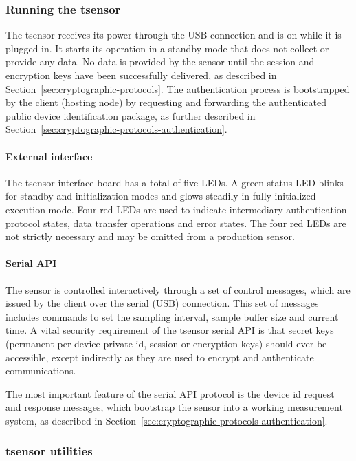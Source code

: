 \subsubsection{Running the tsensor}

The tsensor receives its power through the USB-connection and is on while it is plugged in. It starts its operation in a standby mode that does not collect or provide any data. No data is provided by the sensor until the session and encryption keys have been successfully delivered, as described in Section~\ref{sec:cryptographic-protocols}. The authentication process is bootstrapped by the client (hosting node) by requesting and forwarding the authenticated public device identification package, as further described in Section~\ref{sec:cryptographic-protocols-authentication}.

\paragraph{External interface}

The tsensor interface board has a total of five LEDs. A green status LED blinks for standby and initialization modes and glows steadily in fully initialized execution mode. Four red LEDs are used to indicate intermediary authentication protocol states, data transfer operations and error states. The four red LEDs are not strictly necessary and may be omitted from a production sensor.

\paragraph{Serial API}

The sensor is controlled interactively through a set of control messages, which are issued by the client over the serial (USB) connection. This set of messages includes commands to set the sampling interval, sample buffer size and current time. 
%
A vital security requirement of the tsensor serial API is that secret keys (permanent per-device private id, session or encryption keys) should ever be accessible, except indirectly as they are used to encrypt and authenticate communications.

The most important feature of the serial API protocol is the device id request and response messages, which bootstrap the sensor into a working measurement system, as described in Section~\ref{sec:cryptographic-protocols-authentication}.

\subsubsection{tsensor utilities}

